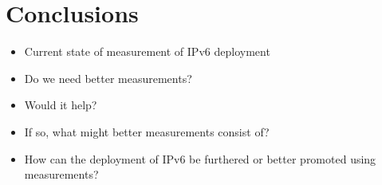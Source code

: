 \section{Conclusions}

\begin{itemize}
    \item Current state of measurement of IPv6 deployment
    \item Do we need better measurements?
    \item Would it help?
    \item If so, what might better measurements consist of?
    \item How can the deployment of IPv6 be furthered or better promoted
using measurements?
\end{itemize}
